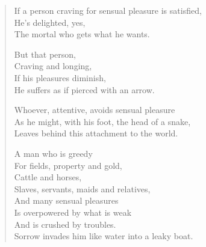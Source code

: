 
\begin{verse}

 If a person craving for sensual pleasure is satisfied,\\
He's delighted, yes,\\
The mortal who gets what he wants.


 But that person,\\
Craving and longing,\\
If his pleasures diminish,\\
He suffers as if pierced with an arrow.


 Whoever, attentive, avoids sensual pleasure\\
As he might, with his foot, the head of a snake,\\
Leaves behind this attachment to the world.


 A man who is greedy\\
For fields, property and gold,\\
Cattle and horses,\\
Slaves, servants, maids and relatives,\\
And many sensual pleasures\\
Is overpowered by what is weak\\
And is crushed by troubles.\\
Sorrow invades him like water into a leaky boat.



\end{verse}
